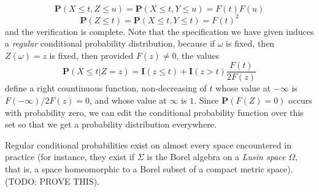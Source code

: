\begin{example}
    \[ \mathbf{P}(X \leq t, Z \leq u) = \mathbf{P}(X \leq t, Y \leq u) = F(t)F(u) \]
    \[ \mathbf{P}(Z \leq t) = \mathbf{P}(X \leq t, Y \leq t) = F(t)^2 \]
    and the verification is complete. Note that the specification we have given induces a {\it regular} conditional probability distribution, because if $\omega$ is fixed, then $Z(\omega) = z$ is fixed, then provided $F(z) \neq 0$, the values
    \[ \mathbf{P}(X \leq t|Z = z) = \mathbf{I}(z \leq t) + \mathbf{I}(z > t) \frac{F(t)}{2F(z)} \]
    define a right countinuous function, non-decreasing of $t$ whose value at $-\infty$ is $F(-\infty)/2F(z) = 0$, and whose value at $\infty$ is $1$. Since $\mathbf{P}(F(Z) = 0)$ occurs with probability zero, we can edit the conditional probability function over this set so that we get a probability distribution everywhere.
\end{example}

Regular conditional probabilities exist on almost every space encountered in practice (for instance, they exist if $\Sigma$ is the Borel algebra on a {\it Lusin space} $\Omega$, that is, a space homeomorphic to a Borel subset of a compact metric space). (TODO: PROVE THIS).

